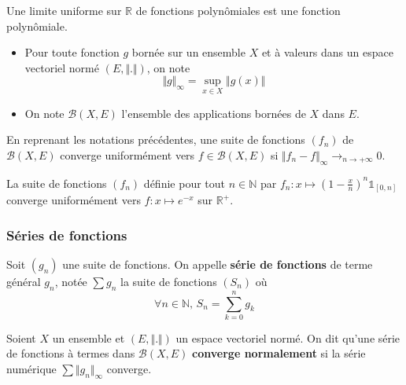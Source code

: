 
  \begin{corollary}
    Une limite uniforme sur $\mathbb{R}$ de fonctions polynômiales est une fonction polynômiale.
  \end{corollary}


  \begin{notation}
    \begin{itemize}
      \item Pour toute fonction $g$ bornée sur un ensemble $X$ et à valeurs dans un espace vectoriel normé $(E, \Vert . \Vert)$, on note
      \[ \Vert g \Vert_\infty = \sup_{x \in X} \Vert g(x) \Vert \]
      \item On note $\mathcal{B}(X,E)$ l'ensemble des applications bornées de $X$ dans $E$.
    \end{itemize}
  \end{notation}

  \begin{proposition}
    En reprenant les notations précédentes, une suite de fonctions $(f_n)$ de $\mathcal{B}(X,E)$ converge uniformément vers $f \in \mathcal{B}(X,E)$ si $\Vert f_n - f \Vert_\infty \longrightarrow_{n \rightarrow +\infty} 0$.
  \end{proposition}

  \begin{example}
    La suite de fonctions $(f_n)$ définie pour tout $n \in \mathbb{N}$ par $f_n : x \mapsto \left( 1 - \frac{x}{n} \right)^n \mathbb{1}_{[0,n]}$ converge uniformément vers $f : x \mapsto e^{-x}$ sur $\mathbb{R}^+$.
  \end{example}

  \subsubsection{Séries de fonctions}


  \begin{definition}
    Soit $(g_n)$ une suite de fonctions. On appelle \textbf{série de fonctions} de terme général $g_n$, notée $\sum g_n$ la suite de fonctions $(S_n)$ où
    \[ \forall n \in \mathbb{N}, \, S_n = \sum_{k=0}^n g_k \]
  \end{definition}

  \begin{definition}
    Soient $X$ un ensemble et $(E, \Vert . \Vert)$ un espace vectoriel normé. On dit qu'une série de fonctions à termes dans $\mathcal{B}(X, E)$ \textbf{converge normalement} si la série numérique $\sum \Vert g_n \Vert_\infty$ converge.
  \end{definition}


